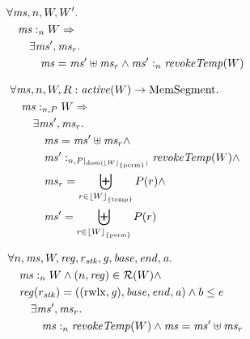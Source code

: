 \documentclass[a4paper]{article}
\DeclarePairedDelimiter\floor{\lfloor}{\rfloor}
\newcommand{\fun}{\rightarrow}
\DeclareMathOperator{\dom}{dom}
\newcommand\lau[1]{{\color{purple} \sf \footnotesize {LS: #1}}\\}
\newcommand\dominique[1]{{\color{purple} \sf \footnotesize {DD: #1}}\\}
\newcommand{\var}[1]{\mathit{#1}}
\newcommand{\hs}{\var{ms}}
\newcommand{\ms}{\hs}
\newcommand{\gl}{\var{g}}
\newcommand{\addr}{\var{a}}
\newcommand{\start}{\var{base}}
\newcommand{\addrend}{\var{end}}
\newcommand{\reg}{\var{reg}}
\newcommand{\heap}{\var{mem}}
\newcommand{\stk}{\var{stk}}
\newcommand{\plainfun}[2]{
  \ifthenelse{\equal{#2}{}}
  {\mathit{#1}}
  {\mathit{#1}(#2)}
}
\newcommand{\revokeTemp}[1]{\plainfun{revokeTemp}{#1}}
\newcommand{\erase}[2]{\floor*{#1}_{\{#2\}}}
\newcommand{\activeReg}[1]{\plainfun{active}{#1}}
\newcommand{\futurewk}{\mathbin{\sqsupseteq}^{\var{pub}}}
\newcommand{\heapSat}[3][\heap]{#1 :_{#2} #3}
\newcommand{\memSat}[3][n]{\heapSat[#2]{#1}{#3}}
\newcommand{\memSatPar}[4][n]{\heapSat[#2]{#1 , #4}{#3}}
\newcommand{\asmType}{\plaindom{AsmType}}
\newcommand{\plaindom}[1]{\mathrm{#1}}
\newcommand{\HeapSegments}{\plaindom{MemSegment}}
\newcommand{\MemSegments}{\HeapSegments}
\newcommand{\intr}[2]{\mathcal{#1}}
\newcommand{\regintr}[1]{\intr{R}{#1}}
\newcommand{\stdrr}{\regintr{\asmType}}
\newcommand{\npair}[2][n]{\left(#1,#2 \right)}
\newcommand{\plainperm}[1]{\mathrm{#1}}
\newcommand{\rwlx}{\plainperm{rwlx}}
\newcommand{\plainview}[1]{\mathrm{#1}}
\newcommand{\perma}{\plainview{perm}}
\newcommand{\temp}{\plainview{temp}}
\begin{document}


\begin{lemma}
  \label{lem:priv-mono-like}
  \begin{align*}
    &      \forall \hs, n, W, W' \ldotp \\
    & \quad  \heapSat[\hs]{n}{W} \Rightarrow\\
    & \qquad \exists \hs', \hs_r \ldotp \\
    & \qquad \quad \hs = \hs' \uplus \hs_r \land \heapSat[\hs']{n}{\wrev{W}}
  \end{align*}
\end{lemma}

\begin{lemma}
  \label{lem:priv-mono-like2}
  \begin{align*}
    & \forall \ms, n, W, R : \activeReg{W} \fun \MemSegments  \ldotp \\
    & \quad \memSatPar{\ms}{W}{P} \Rightarrow \\
    & \qquad \exists \ms', \ms_r\ldotp \\
    & \qquad \quad \ms = \ms' \uplus \ms_r \land \\
    & \qquad \quad \memSatPar{\ms'}{\wrev{W}}{P|_{\dom(\erase{W}{\perma})}} \land \\
    & \qquad \quad \ms_r = \biguplus_{r \in \erase{W}{\temp}} P(r) \land \\
    & \qquad \quad \ms' = \biguplus_{r \in \erase{W}{\perma}} P(r)
  \end{align*}
\end{lemma}

\begin{lemma}
  \label{lem:revoke-temp-stack}
  \begin{align*}
    & \forall n, \ms, W, \reg, r_\stk,\gl,\start,\addrend,\addr \ldotp\\
    & \quad \memSat{\ms}{W} \land \npair{\reg} \in \stdrr(W) \land \\
    & \quad \reg(r_\stk) = ((\rwlx,\gl),\start,\addrend,\addr) \land b \leq e \\
    & \qquad \exists \ms', \ms_r \ldotp \\
    & \qquad \quad \memSat{\ms }{\revokeTemp{W}} \land \ms = \ms' \uplus \ms_r
  \end{align*}
\end{lemma}
\end{document}
